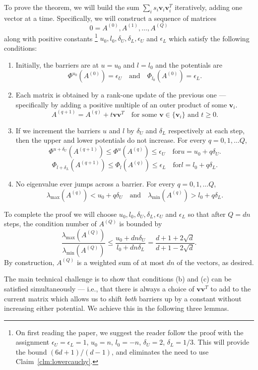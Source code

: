 \documentclass[12pt]{article}
\renewcommand{\v}{\mathbf{v}}
\renewcommand{\v}{\mathbf{v}}
\newcommand{\lmin}{\lambda_\mathrm{min}}
\newcommand{\lmax}{\lambda_\mathrm{max}}
\newcommand{\deltaL}{\delta_{L}}
\newcommand{\deltaU}{\delta_{U}}
\newcommand{\epsL}{\epsilon_{L}}
\newcommand{\epsU}{\epsilon_{U}}
\newcommand\ppi{\mathbf{v}}
\begin{document}
To prove the theorem, we will build the sum $\sum_i s_i\ppi_{i}\ppi_{i}^T$ iteratively, adding one vector at a time.
Specifically, we will construct a sequence of matrices 
\[
   0=A^{(0)},A^{(1)},\ldots, A^{(Q)}
\]
along with positive constants%
\footnote{On first reading the paper, we suggest the reader follow the proof with
  the assignment $\epsU = \epsL = 1$, $u_{0} = n$,
  $l_{0} = -n$, $\deltaU = 2$, $\deltaL = 1/3$.
  This will provide the bound $(6d+1)/ (d-1)$, and eliminates
  the need to use Claim~\ref{clm:lowercauchy}.
}
 $u_0,l_0,\deltaU,\deltaL,\epsU$ and $\epsL$ which satisfy the following conditions:
\begin{enumerate}
\item [(a)] Initially, the barriers are at $u=u_0$ and $l=l_0$ and the potentials are 
\[ \Phi^{u_0}(A^{(0)}) = \epsU \quad \text{and} \quad \Phi_{l_0}(A^{(0)})=\epsL.\]
\item [(b)] Each matrix is obtained by a rank-one update of the previous one ---
specifically by adding a positive multiple of an outer product of some $\v_i$.
\[ A^{(q+1)}=A^{(q)}+t\ppi\ppi^{T} \quad\textrm{for some
  $\ppi\in\{\ppi_{i}\}$ and $t\ge 0$.}\]
\item [(c)] If we increment the barriers $u$ and $l$ by $\deltaU$ and $\deltaL$ respectively
at each step, then the upper and lower potentials do not increase. For every
$q=0,1,\ldots Q$,
\[\Phi^{u+\deltaU}(A^{(q+1)})\le\Phi^{u}(A^{(q)})\le\epsU\quad\textrm{for
$u=u_0+q\deltaU$.}\]
\[\Phi_{l+\deltaL}(A^{(q+1)})\le\Phi_{l}(A^{(q)})\le\epsL\quad\textrm{for
$l=l_0+q\deltaL$.}\]
\item [(d)] No eigenvalue ever jumps across a barrier. For every $q=0,1,\ldots Q$,
\[
\lmax(A^{(q)})< u_0+q\deltaU
\quad \text{and} \quad 
\lmin(A^{(q)})> l_0+q\deltaL.
\]
\end{enumerate}
To complete the proof
 we will choose
 $u_0,l_0,\deltaU,\deltaL,\epsU$ and $\epsL$ so that
after $Q=dn$ steps, the condition number of $A^{(Q)}$ is bounded by
\[
 \frac{\lmax(A^{(Q)})}{\lmin(A^{(Q)})}
 \le \frac{u_0+dn\deltaU}{l_0+dn\deltaL}
 = \frac{d+1+2\sqrt{d}}{d+1-2\sqrt{d}}.
\]
By construction, $A^{(Q)}$ is a weighted sum of at most $dn$ of the vectors, as
desired.

The main technical challenge is to show that conditions (b) and (c) can be
satisfied simultaneously --- i.e., that there is always a choice of $\ppi\ppi^{T} $ to
add to the current matrix which allows us to shift {\em both} barriers up by a 
constant without increasing either potential. We achieve this in the following
three lemmas.
\end{document}
